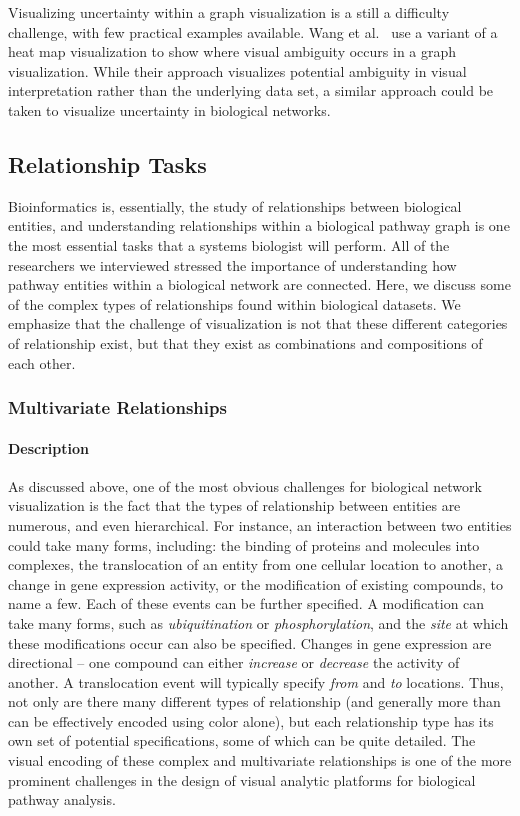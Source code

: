 Visualizing uncertainty within a graph visualization is a still a difficulty challenge, with few practical examples available. 
Wang et al.~\cite{wang2016ambiguityvis} use a variant of a heat map visualization to show where visual ambiguity occurs in a graph visualization.
While their approach visualizes potential ambiguity in visual interpretation rather than the underlying data set, a similar approach could be taken to visualize uncertainty in biological networks.

\subsection*{Relationship Tasks}

Bioinformatics is, essentially, the study of relationships between biological entities, and understanding relationships within a biological pathway graph is one the most essential tasks that a systems biologist will perform.
All of the researchers we interviewed stressed the importance of understanding how pathway entities within a biological network are connected.
Here, we discuss some of the complex types of relationships found within biological datasets.
We emphasize that the challenge of visualization is not that these different categories of relationship exist, but that they exist as combinations and compositions of each other.

\subsubsection*{Multivariate Relationships}

\paragraph*{Description}

As discussed above, one of the most obvious challenges for biological network visualization is the fact that the types of relationship between entities are numerous, and even hierarchical.
For instance, an interaction between two entities could take many forms, including: the binding of proteins and molecules into complexes, the translocation of an entity from one cellular location to another, a change in gene expression activity, or the modification of existing compounds, to name a few.
Each of these events can be further specified.
A modification can take many forms, such as \textit{ubiquitination} or \textit{phosphorylation}, and the \textit{site} at which these modifications occur can also be specified.
Changes in gene expression are directional -- one compound can either \textit{increase} or \textit{decrease} the activity of another.
A translocation event will typically specify \textit{from} and \textit{to} locations.
Thus, not only are there many different types of relationship (and generally more than can be effectively encoded using color alone), but each relationship type has its own set of potential specifications, some of which can be quite detailed.
The visual encoding of these complex and multivariate relationships is one of the more prominent challenges in the design of visual analytic platforms for biological pathway analysis.

